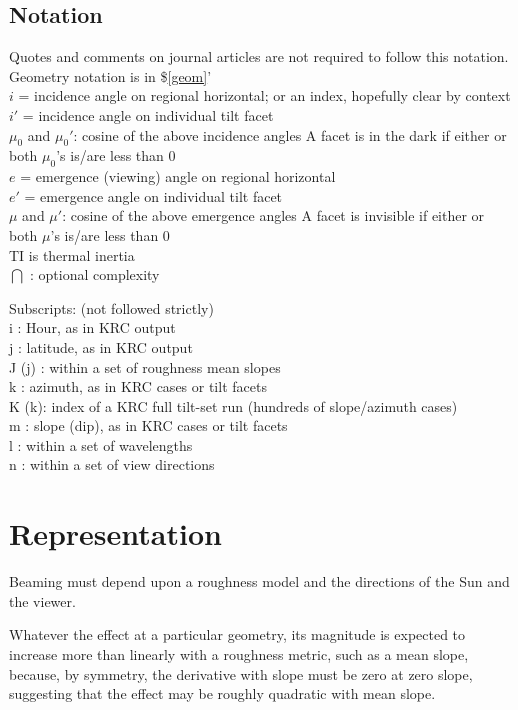 \documentclass{article}
\begin{document}
\subsection{Notation \label{nota} }
Quotes and comments on journal articles are not required to follow this notation.
Geometry notation is in \$\ref{geom}'
\\ $i$ = incidence angle on regional horizontal; or an index, hopefully clear by context
\\ $i'$ = incidence angle on individual tilt facet
\\ $\mu_0$ and $\mu_0'$: cosine of the above incidence angles
\qi  A facet is in the dark if either or both $\mu_0$'s is/are less than 0
\\ $e$ = emergence (viewing) angle on regional horizontal
\\ $e'$ = emergence angle on individual tilt facet
\\ $\mu$ and $\mu'$: cosine of the above emergence angles
\qi  A facet is invisible if either or both $\mu$'s is/are less than 0
\\ TI is thermal inertia
\\ $\bigcap$ : optional complexity

Subscripts: (not followed strictly)
\\ i : Hour, as in KRC output
\\ j : latitude,  as in KRC output
\\ J (j) : within a set of roughness mean slopes
\\ k : azimuth, as in KRC cases or tilt facets
\\ K (k): index of a KRC full tilt-set run (hundreds of slope/azimuth cases)
\\ m : slope (dip), as in KRC cases or tilt facets 
\\ l : within a set of wavelengths
\\ n : within a set of view directions 

\section{Representation}

Beaming must depend upon a roughness model and the directions of the Sun and the
viewer.

Whatever the effect at a particular geometry, its magnitude is expected to
increase more than linearly with a roughness metric, such as a mean slope,
because, by symmetry, the derivative with slope must be zero at zero slope,
suggesting that the effect may be roughly quadratic with mean slope.
\end{document}
